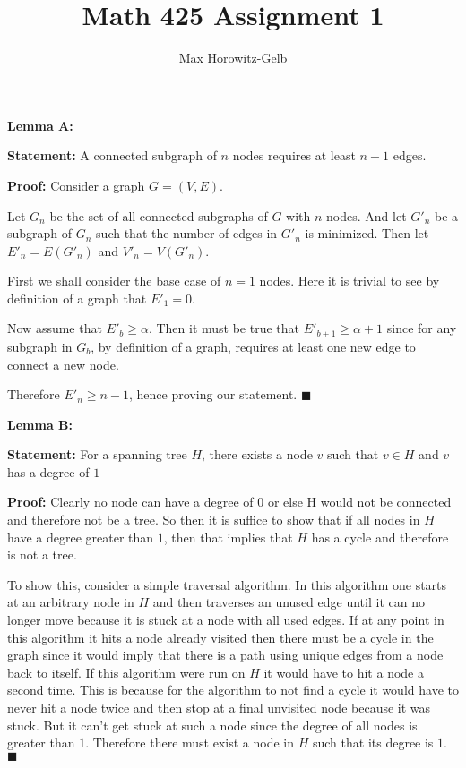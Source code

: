 \documentclass{article}
\title{Math 425 Assignment 1}
\author{Max Horowitz-Gelb}
\date{}
\newcommand*{\QEDA}{\hfill\ensuremath{\blacksquare}}%
\begin{document}
\maketitle
\section{}
\section{}
\textbf{Lemma A:}

\textbf{Statement:} A connected subgraph of $n$ nodes requires at least $n-1$ edges.

\textbf{Proof:} Consider a graph $G = (V,E)$. 

Let $G_n$ be the set of all connected subgraphs of $G$ with $n$ nodes. And let $G'_n$ be a subgraph of $G_n$ such that the number of edges in $G'_n$ is minimized. Then let $E'_n = E(G'_n)$ and $V'_n = V(G'_n)$.

First we shall consider the base case of $n = 1$ nodes. Here it is trivial to see by definition of a graph that $E'_1 = 0$. 

Now assume that $E'_b \geq \alpha$. Then it must be true that $E'_{b+1} \geq \alpha + 1$ since for any subgraph in $G_b$, by definition of a graph, requires at least one new edge to connect a new node.

Therefore $E'_n \geq n-1$, hence proving our statement. 
\QEDA

\textbf{Lemma B:}

\textbf{Statement:}
For a spanning tree $H$, there exists a node $v$ such that $v \in H$ and $v$ has a degree of $1$

\textbf{Proof:} Clearly no node can have a degree of $0$ or else H would not be connected and therefore not be a tree. So then it is suffice to show that if all nodes in $H$ have a degree greater than $1$, then that implies that $H$ has a cycle and therefore is not a tree. 

To show this, consider a simple traversal algorithm. In this algorithm one starts at an arbitrary node in $H$ and then traverses an unused edge until it can no longer move because it is stuck at a node with all used edges. If at any point in this algorithm it hits a node already visited then there must be a cycle in the graph since it would imply that there is a path using unique edges from a node back to itself. If this algorithm were run on $H$ it would have to hit a node a second time. This is because for the algorithm to not find a cycle it would have to never hit a node twice and then stop at a final unvisited node because it was stuck. But it can't get stuck at such a node since the degree of all nodes is greater than $1$. Therefore there must exist a node in $H$ such that its degree is $1$.
\QEDA
\end{document}
